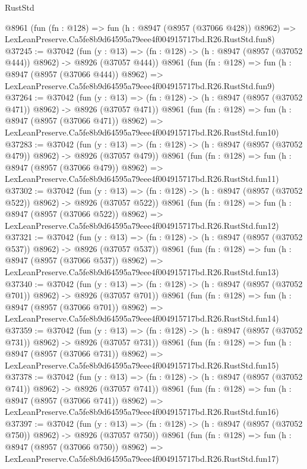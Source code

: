 \begin{lexlean}{RustStd}
\begin{coremodule}
    @8961
    (fun (fn : @128) =>
    fun (h : @8947 (@8957 (@37066 @428)) @8962) =>
    LexLeanPreserve.Ca5fe8b9d64595a79eee4f004915717bd.R26.RustStd.fun8)
@37245 := @37042
    (fun (y : @13) => (fn : @128) -> (h : @8947 (@8957 (@37052 @444)) @8962) -> @8926 (@37057 @444))
    @8961
    (fun (fn : @128) =>
    fun (h : @8947 (@8957 (@37066 @444)) @8962) =>
    LexLeanPreserve.Ca5fe8b9d64595a79eee4f004915717bd.R26.RustStd.fun9)
@37264 := @37042
    (fun (y : @13) => (fn : @128) -> (h : @8947 (@8957 (@37052 @471)) @8962) -> @8926 (@37057 @471))
    @8961
    (fun (fn : @128) =>
    fun (h : @8947 (@8957 (@37066 @471)) @8962) =>
    LexLeanPreserve.Ca5fe8b9d64595a79eee4f004915717bd.R26.RustStd.fun10)
@37283 := @37042
    (fun (y : @13) => (fn : @128) -> (h : @8947 (@8957 (@37052 @479)) @8962) -> @8926 (@37057 @479))
    @8961
    (fun (fn : @128) =>
    fun (h : @8947 (@8957 (@37066 @479)) @8962) =>
    LexLeanPreserve.Ca5fe8b9d64595a79eee4f004915717bd.R26.RustStd.fun11)
@37302 := @37042
    (fun (y : @13) => (fn : @128) -> (h : @8947 (@8957 (@37052 @522)) @8962) -> @8926 (@37057 @522))
    @8961
    (fun (fn : @128) =>
    fun (h : @8947 (@8957 (@37066 @522)) @8962) =>
    LexLeanPreserve.Ca5fe8b9d64595a79eee4f004915717bd.R26.RustStd.fun12)
@37321 := @37042
    (fun (y : @13) => (fn : @128) -> (h : @8947 (@8957 (@37052 @537)) @8962) -> @8926 (@37057 @537))
    @8961
    (fun (fn : @128) =>
    fun (h : @8947 (@8957 (@37066 @537)) @8962) =>
    LexLeanPreserve.Ca5fe8b9d64595a79eee4f004915717bd.R26.RustStd.fun13)
@37340 := @37042
    (fun (y : @13) => (fn : @128) -> (h : @8947 (@8957 (@37052 @701)) @8962) -> @8926 (@37057 @701))
    @8961
    (fun (fn : @128) =>
    fun (h : @8947 (@8957 (@37066 @701)) @8962) =>
    LexLeanPreserve.Ca5fe8b9d64595a79eee4f004915717bd.R26.RustStd.fun14)
@37359 := @37042
    (fun (y : @13) => (fn : @128) -> (h : @8947 (@8957 (@37052 @731)) @8962) -> @8926 (@37057 @731))
    @8961
    (fun (fn : @128) =>
    fun (h : @8947 (@8957 (@37066 @731)) @8962) =>
    LexLeanPreserve.Ca5fe8b9d64595a79eee4f004915717bd.R26.RustStd.fun15)
@37378 := @37042
    (fun (y : @13) => (fn : @128) -> (h : @8947 (@8957 (@37052 @741)) @8962) -> @8926 (@37057 @741))
    @8961
    (fun (fn : @128) =>
    fun (h : @8947 (@8957 (@37066 @741)) @8962) =>
    LexLeanPreserve.Ca5fe8b9d64595a79eee4f004915717bd.R26.RustStd.fun16)
@37397 := @37042
    (fun (y : @13) => (fn : @128) -> (h : @8947 (@8957 (@37052 @750)) @8962) -> @8926 (@37057 @750))
    @8961
    (fun (fn : @128) =>
    fun (h : @8947 (@8957 (@37066 @750)) @8962) =>
    LexLeanPreserve.Ca5fe8b9d64595a79eee4f004915717bd.R26.RustStd.fun17)

\end{coremodule}
\end{lexlean}
